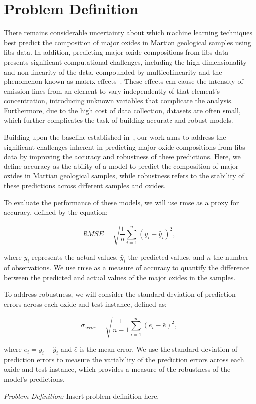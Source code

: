 \section{Problem Definition}\label{sec:problem_definition}
There remains considerable uncertainty about which machine learning techniques best predict the composition of major oxides in Martian geological samples using \gls{libs} data.
In addition, predicting major oxide compositions from \gls{libs} data presents significant computational challenges, including the high dimensionality and non-linearity of the data, compounded by multicollinearity and the phenomenon known as matrix effects~\cite{andersonImprovedAccuracyQuantitative2017}.
These effects can cause the intensity of emission lines from an element to vary independently of that element's concentration, introducing unknown variables that complicate the analysis.
Furthermore, due to the high cost of data collection, datasets are often small, which further complicates the task of building accurate and robust models.

Building upon the baseline established in~\citet{p9_paper}, our work aims to address the significant challenges inherent in predicting major oxide compositions from \gls{libs} data by improving the accuracy and robustness of these predictions.
Here, we define accuracy as the ability of a model to predict the composition of major oxides in Martian geological samples, while robustness refers to the stability of these predictions across different samples and oxides.

To evaluate the performance of these models, we will use \gls{rmse} as a proxy for accuracy, defined by the equation:

\begin{equation}
	RMSE = \sqrt{\frac{1}{n} \sum_{i=1}^{n} (y_i - \hat{y}_i)^2},
\end{equation}

where $y_i$ represents the actual values, $\hat{y}_i$ the predicted values, and $n$ the number of observations.
We use \gls{rmse} as a measure of accuracy to quantify the difference between the predicted and actual values of the major oxides in the samples.

To address robustness, we will consider the standard deviation of prediction errors across each oxide and test instance, defined as:

\begin{equation}
	\sigma_{error} = \sqrt{\frac{1}{n-1} \sum_{i=1}^{n} (e_i - \bar{e})^2},
\end{equation}

where $e_i = y_i - \hat{y}_i$ and $\bar{e}$ is the mean error.
We use the standard deviation of prediction errors to measure the variability of the prediction errors across each oxide and test instance, which provides a measure of the robustness of the model's predictions.

\textit{Problem Definition:} Insert problem definition here.
